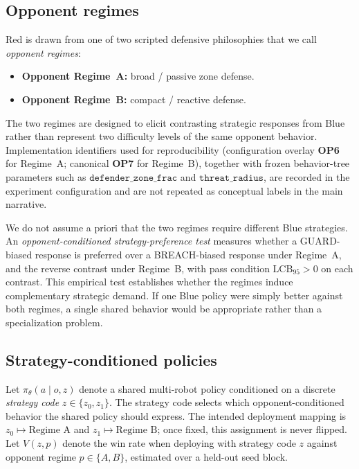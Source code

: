 \documentclass{article}
\begin{document}
\subsection{Opponent regimes}

Red is drawn from one of two scripted defensive philosophies that we call
\emph{opponent regimes}:
\begin{itemize}
  \item \textbf{Opponent Regime~A:} broad / passive zone defense.
  \item \textbf{Opponent Regime~B:} compact / reactive defense.
\end{itemize}
The two regimes are designed to elicit contrasting strategic responses from
Blue rather than represent two difficulty levels of the same opponent behavior.
Implementation identifiers used for reproducibility (configuration overlay
\textbf{OP6} for Regime~A; canonical \textbf{OP7} for Regime~B), together with
frozen behavior-tree parameters such as
$\texttt{defender\_zone\_frac}$ and $\texttt{threat\_radius}$, are recorded in
the experiment configuration and are not repeated as conceptual labels in the
main narrative.

We do not assume a priori that the two regimes require different Blue
strategies. An \emph{opponent-conditioned strategy-preference test} measures
whether a GUARD-biased response is preferred over a BREACH-biased response under
Regime~A, and the reverse contrast under Regime~B, with pass condition
$\mathrm{LCB}_{95}>0$ on each contrast. This empirical test establishes whether
the regimes induce complementary strategic demand. If one Blue policy were
simply better against both regimes, a single shared behavior would be
appropriate rather than a specialization problem.

\subsection{Strategy-conditioned policies}

Let $\pi_\theta(a\mid o,z)$ denote a shared multi-robot policy conditioned on a
discrete \emph{strategy code} $z\in\{z_0,z_1\}$. The strategy code selects which
opponent-conditioned behavior the shared policy should express. The intended
deployment mapping is $z_0\mapsto\text{Regime~A}$ and $z_1\mapsto\text{Regime~B}$;
once fixed, this assignment is never flipped. Let $V(z,p)$ denote the win rate
when deploying with strategy code $z$ against opponent regime
$p\in\{A,B\}$, estimated over a held-out seed block.
\end{document}
